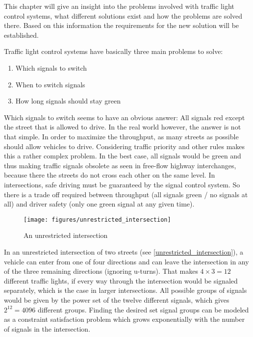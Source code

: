 This chapter will give an insight into the problems involved with traffic light control systems, what different solutions exist and how the problems are solved there. Based on this information the requirements for the new solution will be established.

Traffic light control systems have basically three main problems to solve:

\begin{enumerate}
	\item Which signals to switch
	\item When to switch signals
	\item How long signals should stay green
\end{enumerate}

Which signals to switch seems to have an obvious answer: All signals red except the street that is allowed to drive. In the real world however, the answer is not that simple. In order to maximize the throughput, as many streets as possible should allow vehicles to drive. Considering traffic priority and other rules makes this a rather complex problem. In the best case, all signals would be green and thus making traffic signals obsolete as seen in free-flow highway interchanges, because there the streets do not cross each other on the same level. In intersections, safe driving must be guaranteed by the signal control system. So there is a trade off required between throughput (all signals green / no signals at all) and driver safety (only one green signal at any given time). \cite{intersection_collision_avoidance}

\begin{figure}[ht]
	\centering
	\texttt{[image: figures/unrestricted\_intersection]}
	\caption{An unrestricted intersection}
	\label{unrestricted_intersection}
\end{figure}

In an unrestricted intersection of two streets (see \autoref{unrestricted_intersection}), a vehicle can enter from one of four directions and can leave the intersection in any of the three remaining directions (ignoring u-turns). That makes $4 \times 3 = 12$ different traffic lights, if every way through the intersection would be signaled separately, which is the case in larger intersections. All possible groups of signals would be given by the power set of the twelve different signals, which gives $2^{12} = 4096$ different groups. Finding the desired set signal groups can be modeled as a constraint satisfaction problem which grows exponentially with the number of signals in the intersection.

